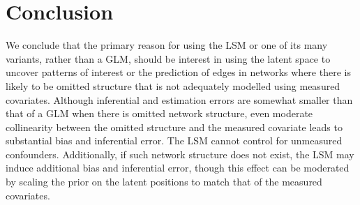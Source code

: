 \documentclass[11pt]{article}
\begin{document}
\section{Conclusion}

We conclude that the primary reason for using the LSM or one of its many variants, rather than a GLM, should be interest in using the latent space to uncover patterns of interest or the prediction of edges in networks where there is likely to be omitted structure that is not adequately modelled using measured covariates. Although inferential and estimation errors are somewhat smaller than that of a GLM when there is omitted network structure, even moderate collinearity between the omitted structure and the measured covariate leads to substantial bias and inferential error. The LSM cannot control for unmeasured confounders. Additionally, if such network structure does not exist, the LSM may induce additional bias and inferential error, though this effect can be moderated by scaling the prior on the latent positions to match that of the measured covariates.

\newpage



\end{document}
